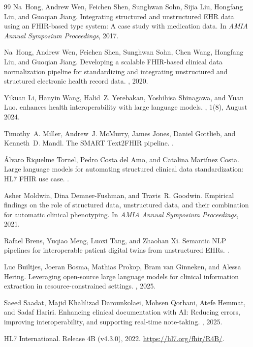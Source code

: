 \begin{thebibliography}{99}
Na~Hong, Andrew Wen, Feichen Shen, Sunghwan Sohn, Sijia Liu, Hongfang Liu,
  and Guoqian Jiang.
\newblock Integrating structured and unstructured {EHR} data using an
  {FHIR}-based type system: A case study with medication data.
\newblock In {\em AMIA Annual Symposium Proceedings}, 2017.

Na~Hong, Andrew Wen, Feichen Shen, Sunghwan Sohn, Chen Wang, Hongfang Liu,
  and Guoqian Jiang.
\newblock Developing a scalable {FHIR}-based clinical data normalization
  pipeline for standardizing and integrating unstructured and structured
  electronic health record data.
,
  2020.

Yikuan Li, Hanyin Wang, Halid~Z. Yerebakan, Yoshihisa Shinagawa, and Yuan Luo.
 enhances health interoperability with large language
  models.
, 1(8), August 2024.

Timothy~A. Miller, Andrew~J. McMurry, James Jones, Daniel Gottlieb, and
  Kenneth~D. Mandl.
\newblock The {SMART} {Text2FHIR} pipeline.
.

{\'A}lvaro {Riquelme Tornel}, Pedro {Costa del Amo}, and Catalina
  {Mart{\'i}nez Costa}.
\newblock Large language models for automating structured clinical data
  standardization: {HL7 FHIR} use case.
.


Asher Moldwin, Dina Demner-Fushman, and Travis~R. Goodwin.
\newblock Empirical findings on the role of structured data, unstructured data,
  and their combination for automatic clinical phenotyping.
\newblock In {\em AMIA Annual Symposium Proceedings}, 2021.

Rafael Brens, Yuqiao Meng, Luoxi Tang, and Zhaohan Xi.
\newblock Semantic {NLP} pipelines for interoperable patient digital twins from
  unstructured {EHR}s.
.

Luc Builtjes, Joeran Bosma, Mathias Prokop, Bram {van Ginneken}, and
  Alessa Hering.
\newblock Leveraging open-source large language models for clinical information
  extraction in resource-constrained settings.
, 2025.

Saeed Saadat, Majid {Khalilizad Darounkolaei}, Mohsen Qorbani, Atefe Hemmat,
  and Sadaf Hariri.
\newblock Enhancing clinical documentation with {AI}: Reducing errors,
  improving interoperability, and supporting real-time note-taking.
, 2025.


{HL7 International}.
 Release 4B (v4.3.0), 2022.
\newblock \url{https://hl7.org/fhir/R4B/}.

\end{thebibliography}
